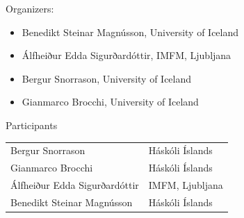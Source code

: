 \documentclass[12pt,openany]{report}      %
\begin{document}
\vfill
\vfill
\noindent
Organizers:
\begin{itemize}
    \setlength\itemsep{-0.3 em}
    \item Benedikt Steinar Magnússon, University of Iceland
    \item Álfheiður Edda Sigurðardóttir, IMFM, Ljubljana
    \item Bergur Snorrason, University of Iceland
    \item Gianmarco Brocchi, University of Iceland
\end{itemize}
\vfill

\pagebreak

\newcommand\talk[3]{%
    \vspace{3 ex}
    \noindent
    \textsc{\large #1}

    \smallskip
    \noindent
    \textbf{\textit{#2}}

    \medskip
    \noindent
    #3

}




\pagebreak



\pagebreak





\newpage
\noindent
{\LARGE Participants}

\bigskip
\bigskip
\noindent
\begin{tabular}{l@{ } l@{}}
    Bergur Snorrason
    &
    Háskóli Íslands
\\
    Gianmarco Brocchi
    &
    Háskóli Íslands
\\
    Álfheiður Edda Sigurðardóttir
    &
    IMFM, Ljubljana
\\
    Benedikt Steinar Magnússon 
    &
    Háskóli Íslands
\end{tabular}
\restoregeometry

\newpage
\end{document}
